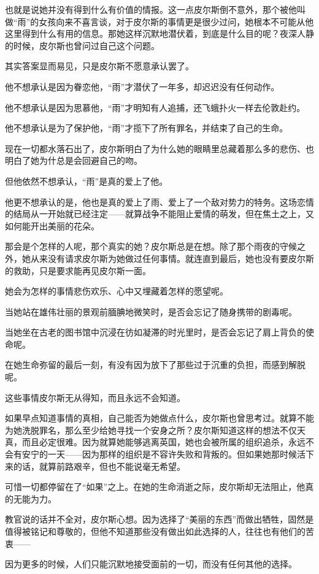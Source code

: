 也就是说她并没有得到什么有价值的情报。这一点皮尔斯倒不意外，那个被他叫做“雨”的女孩向来不喜言谈，对于皮尔斯的事情更是很少过问，她根本不可能从他这里得到什么有用的信息。那她这样沉默地潜伏着，到底是什么目的呢？夜深人静的时候，皮尔斯也曾问过自己这个问题。

其实答案显而易见，只是皮尔斯不愿意承认罢了。

他不想承认是因为眷恋他，“雨”才潜伏了一年多，却迟迟没有任何动作。

他不想承认是因为思慕他，“雨”才明知有人追捕，还飞蛾扑火一样去伦敦赴约。

他不想承认是为了保护他，“雨”才揽下了所有罪名，并结束了自己的生命。

现在一切都水落石出了，皮尔斯明白了为什么她的眼睛里总藏着那么多的悲伤、也明白了她为什总是会回避自己的吻。

但他依然不想承认，“雨”是真的爱上了他。

他更不想承认的是，他也是真的爱上了雨、爱上了一个敌对势力的特务。这场恋情的结局从一开始就已经注定——就算战争不能阻止爱情的萌发，但在焦土之上，又如何能开出美丽的花朵。

那会是个怎样的人呢，那个真实的她？皮尔斯总是在想。除了那个雨夜的守候之外，她从来没有请求皮尔斯为她做过任何事情。就连直到最后，她也没有要皮尔斯的救助，只是要求能再见皮尔斯一面。

她会为怎样的事情悲伤欢乐、心中又埋藏着怎样的愿望呢。

当她站在雄伟壮丽的景观前腼腆地微笑时，是否会忘记了随身携带的剧毒呢。

当她坐在古老的图书馆中沉浸在彷如凝滞的时光里时，是否会忘记了肩上背负的使命呢。

在她生命弥留的最后一刻，有没有因为放下了那些过于沉重的负担，而感到解脱呢。

这些事情皮尔斯无从得知，而且永远不会知道。

如果早点知道事情的真相，自己能否为她做点什么，皮尔斯也曾思考过。就算不能为她洗脱罪名，那么至少给她寻找一个安身之所？皮尔斯知道这样的想法不仅天真，而且必定很难。因为就算她能够逃离英国，她也会被所属的组织追杀，永远不会有安宁的一天——因为那样的组织是不容许失败和背叛的。但如果她那时候活下来的话，就算前路艰辛，但也不能说毫无希望。

可惜一切都停留在了“如果”之上。在她的生命消逝之际，皮尔斯却无法阻止，他真的无能为力。

教官说的话并不全对，皮尔斯心想。因为选择了“美丽的东西”而做出牺牲，固然是值得被铭记和尊敬的，但他不知道那些没有做出如此选择的人，往往也有他们的苦衷——

因为更多的时候，人们只能沉默地接受面前的一切，而没有任何其他的选择。

